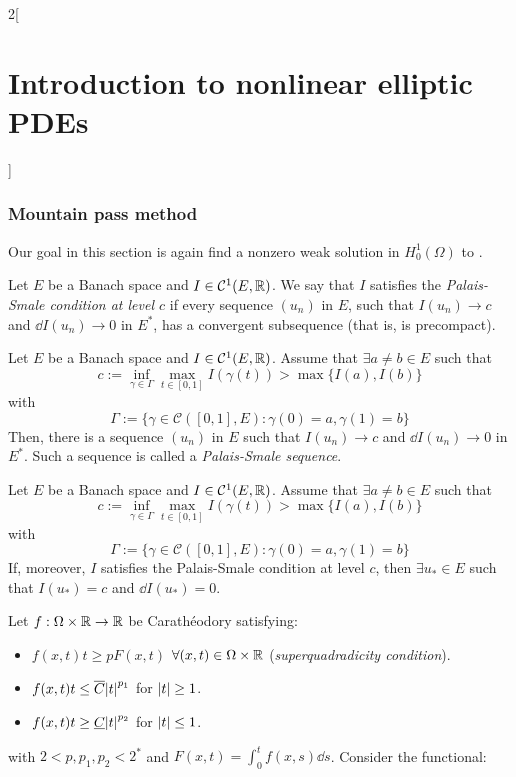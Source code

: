 \documentclass[../../../main_math.tex]{subfiles}
\begin{document}
\begin{multicols}{2}[\section{Introduction to nonlinear elliptic PDEs}]
  \subsubsection{Mountain pass method}
  Our goal in this section is again find a nonzero weak solution in $H_0^1(\Omega)$ to .
  \begin{definition}
    Let $E$ be a Banach space and $I\in\mathcal{C}^1(E,\mathbb{R})$. We say that $I$ satisfies the \emph{Palais-Smale condition at level $c$} if every sequence $(u_n)$ in $E$, such that $I(u_n)\to c$ and $\dd{I(u_n)}\to 0$ in $E^*$, has a convergent subsequence (that is, is precompact).
  \end{definition}
  \begin{theorem}
    Let $E$ be a Banach space and $I\in\mathcal{C}^1(E,\mathbb{R})$. Assume that $\exists a\ne b\in E$ such that
    $$
      c:=\inf_{\gamma\in \Gamma}\max_{t\in [0,1]}I(\gamma(t))>\max\{I(a),I(b)\}
    $$
    with $$
      \Gamma:=\{\gamma\in \mathcal{C}([0,1],E):\gamma(0)=a,\gamma(1)=b\}
    $$
    Then, there is a sequence $(u_n)$ in $E$ such that $I(u_n)\to c$ and $\dd{I(u_n)}\to 0$ in $E^*$. Such a sequence is called a \emph{Palais-Smale sequence}.
  \end{theorem}
  \begin{corollary}\label{INEPDE:mountain_pass}
    Let $E$ be a Banach space and $I\in\mathcal{C}^1(E,\mathbb{R})$. Assume that $\exists a\ne b\in E$ such that
    $$
      c:=\inf_{\gamma\in \Gamma}\max_{t\in [0,1]}I(\gamma(t))>\max\{I(a),I(b)\}
    $$
    with $$
      \Gamma:=\{\gamma\in \mathcal{C}([0,1],E):\gamma(0)=a,\gamma(1)=b\}
    $$
    If, moreover, $I$ satisfies the Palais-Smale condition at level $c$, then $\exists u_*\in E$ such that $I(u_*)=c$ and $\dd{I(u_*)}=0$.
  \end{corollary}
  \begin{proposition}
    Let $f:\Omega\times \mathbb{R}\to\mathbb{R}$ be Carathéodory satisfying:
    \begin{itemize}
      \item $f(x,t)t\geq p F(x,t)$ $\forall (x,t)\in \Omega\times \mathbb{R}$ (\emph{superquadradicity condition}).
      \item $f(x,t)t\leq \overline{C}\abs{t}^{p_1}$ for $\abs{t}\geq 1$.
      \item $f(x,t)t\geq \underline{C} \abs{t}^{p_2}$ for $\abs{t}\leq 1$.
    \end{itemize}
    with $2<p,p_1,p_2<2^*$ and $F(x,t)=\int_0^tf(x,s)\dd{s}$. Consider the functional:

\end{proposition}
\end{multicols}
\end{document}
